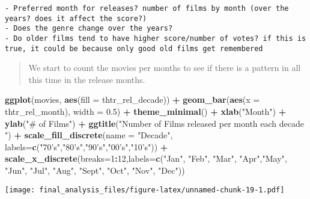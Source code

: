 \documentclass[]{article}
\newenvironment{Shaded}{\begin{snugshade}}{\end{snugshade}}
\newcommand{\DataTypeTok}[1]{\textcolor[rgb]{0.13,0.29,0.53}{#1}}
\newcommand{\DecValTok}[1]{\textcolor[rgb]{0.00,0.00,0.81}{#1}}
\newcommand{\FloatTok}[1]{\textcolor[rgb]{0.00,0.00,0.81}{#1}}
\newcommand{\KeywordTok}[1]{\textcolor[rgb]{0.13,0.29,0.53}{\textbf{#1}}}
\newcommand{\NormalTok}[1]{#1}
\newcommand{\OperatorTok}[1]{\textcolor[rgb]{0.81,0.36,0.00}{\textbf{#1}}}
\newcommand{\StringTok}[1]{\textcolor[rgb]{0.31,0.60,0.02}{#1}}
\begin{document}
\begin{verbatim}
- Preferred month for releases? number of films by month (over the years? does it affect the score?)
- Does the genre change over the years?
- Do older films tend to have higher score/number of votes? if this is true, it could be because only good old films get remembered
\end{verbatim}

\begin{quote}
We start to count the movies per months to see if there is a pattern in
all this time in the release months.
\end{quote}

\begin{Shaded}
\begin{Highlighting}[]
\KeywordTok{ggplot}\NormalTok{(movies, }\KeywordTok{aes}\NormalTok{(}\DataTypeTok{fill =}\NormalTok{ thtr_rel_decade)) }\OperatorTok{+}\StringTok{ }\KeywordTok{geom_bar}\NormalTok{(}\KeywordTok{aes}\NormalTok{(}\DataTypeTok{x =}\NormalTok{ thtr_rel_month), }\DataTypeTok{width =} \FloatTok{0.5}\NormalTok{) }\OperatorTok{+}\StringTok{ }\KeywordTok{theme_minimal}\NormalTok{() }\OperatorTok{+}\StringTok{ }\KeywordTok{xlab}\NormalTok{(}\StringTok{"Month"}\NormalTok{) }\OperatorTok{+}\StringTok{ }\KeywordTok{ylab}\NormalTok{(}\StringTok{"# of Films"}\NormalTok{) }\OperatorTok{+}\StringTok{ }\KeywordTok{ggtitle}\NormalTok{(}\StringTok{"Number of Films released per month each decade "}\NormalTok{) }\OperatorTok{+}\StringTok{ }\KeywordTok{scale_fill_discrete}\NormalTok{(}\DataTypeTok{name =} \StringTok{"Decade"}\NormalTok{, }\DataTypeTok{labels=}\KeywordTok{c}\NormalTok{(}\StringTok{"70's"}\NormalTok{,}\StringTok{"80's"}\NormalTok{,}\StringTok{"90's"}\NormalTok{,}\StringTok{"00's"}\NormalTok{,}\StringTok{"10's"}\NormalTok{)) }\OperatorTok{+}\StringTok{ }\KeywordTok{scale_x_discrete}\NormalTok{(}\DataTypeTok{breaks=}\DecValTok{1}\OperatorTok{:}\DecValTok{12}\NormalTok{,}\DataTypeTok{labels=}\KeywordTok{c}\NormalTok{(}\StringTok{"Jan"}\NormalTok{, }\StringTok{"Feb"}\NormalTok{, }\StringTok{"Mar"}\NormalTok{, }\StringTok{"Apr"}\NormalTok{,}\StringTok{"May"}\NormalTok{, }\StringTok{"Jun"}\NormalTok{, }\StringTok{"Jul"}\NormalTok{, }\StringTok{"Aug"}\NormalTok{, }\StringTok{"Sept"}\NormalTok{, }\StringTok{"Oct"}\NormalTok{, }\StringTok{"Nov"}\NormalTok{, }\StringTok{"Dec"}\NormalTok{))}
\end{Highlighting}
\end{Shaded}

\texttt{[image: final\_analysis\_files/figure-latex/unnamed-chunk-19-1.pdf]}
\end{document}
